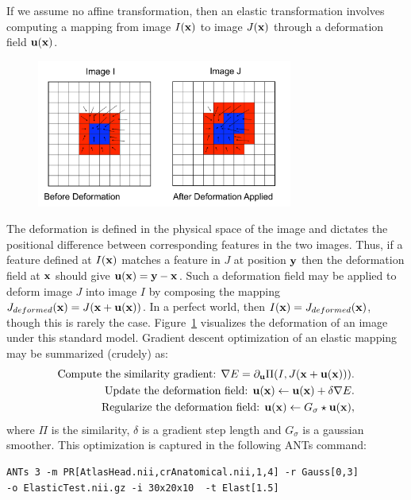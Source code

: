 \documentclass{InsightArticle}
\newcommand{\x}{{\bf x}}
\newcommand{\y}{{\bf y}}
\newcommand{\disp}{{\bf u}}
\begin{document}
 If we assume no affine transformation, then 
an elastic transformation involves computing a mapping from image $I(\x)$ to image $J(\x)$ 
through a deformation field $\disp( \x )$.  
\begin{figure}
\center \includegraphics[width=0.75\textwidth]{./Figures/PullBack.pdf} 
\label{fig:pull}
\end{figure}  
The deformation is defined in the physical space of the image 
and dictates the positional difference between corresponding features in the two images.  
Thus, if a feature defined at $I(\x)$ matches a feature in $J$ at position $\y$ then the deformation 
field at $\x$ should give $\disp ( \x )=\y-\x$.   
Such a deformation field may be applied to deform 
image $J$ into image $I$ by composing the mapping $J_{deformed}(\x)=J(\x+\disp(\x))$.  
In a perfect world, then $I(\x)=J_{deformed}(\x)$, though this is rarely the case.  Figure~\ref{fig:pull} 
visualizes the deformation of an image under this standard model. 
Gradient descent optimization of an elastic mapping may be summarized (crudely) as: 
\begin{align}
\text{Compute the similarity gradient:   }  \nabla E = \partial_{\disp} \Pi(I,J(\x+\disp(\x))). \nonumber \\
\text{Update the deformation field:  }  \disp(\x) \leftarrow \disp(\x)+\delta \nabla E. \nonumber \\ 
\text{Regularize the deformation field:  }  \disp(\x) \leftarrow G_\sigma \star \disp(\x),
\end{align}
where $\Pi$ is the similarity, $\delta$ is a gradient step length and $G_\sigma$ is a gaussian smoother.
This optimization is captured in the following ANTs command:
\begin{verbatim}
ANTs 3 -m PR[AtlasHead.nii,crAnatomical.nii,1,4] -r Gauss[0,3]  
-o ElasticTest.nii.gz -i 30x20x10  -t Elast[1.5] 
\end{verbatim}
\end{document}
